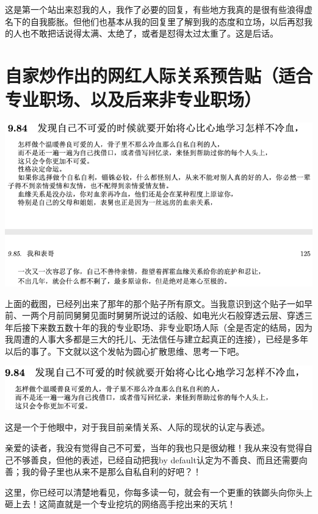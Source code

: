 \documentclass[9pt, b5paper]{article}
\begin{document}
这是第一个站出来怼我的人，我作了必要的回复，有些地方我真的是很有些浪得虚名下的自我膨胀。但他们也基本从我的回复里了解到我的态度和立场，以后再怼我的人也不敢把话说得太满、太绝了，或者是怼得太过太重了。这是后话。 

\section{自家炒作出的网红人际关系预告贴（适合专业职场、以及后来非专业职场）}
\label{sec:org50d7cc9}

\begin{center}
\includegraphics[width=.9\linewidth]{./pic/p1p125.png}
\end{center}

上面的截图，已经列出来了那年的那个贴子所有原文。当我意识到这个贴子一如早前、一两个月前同舅舅见面时舅舅所说过的话般、如电光火石般穿透云层、穿透三年后接下来数五数十年的我的专业职场、非专业职场人际（全是否定的结局，因为我周遭的人事大多都是三大的托儿、无法信任与建立起真正的连接），已经是多年以后的事了。下文就以这个发帖为圆心扩散思维、思考一下吧。 

\begin{center}
\includegraphics[width=.9\linewidth]{./pic/backups_plans_20210413_130937.png}
\end{center}

这是一个于他眼中，对于我目前亲情关系、人际的现状的认定与表述。

亲爱的读者，我没有觉得自己不可爱，当年的我也只是很幼稚！我从来没有觉得自己不够善良，但他的表述，已经自动把我by default认定为不善良、而且还需要向善；我的骨子里也从来不是那么自私自利的好吧？！

这里，你已经可以清楚地看见，你每多读一句，就会有一个更重的铁鎯头向你头上砸上去！这简直就是一个专业挖坑的网络高手挖出来的天坑！
\end{document}
